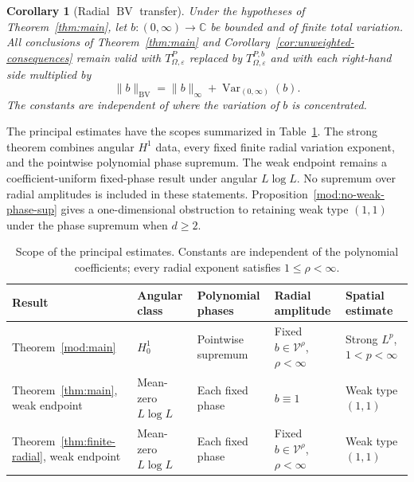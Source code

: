 \documentclass[11pt]{article}
\numberwithin{equation}{section}
\newtheorem{corollary}[theorem]{Corollary}
\theoremstyle{remark}
\theoremstyle{definition}
\newcommand{\Var}{\operatorname{Var}}
\newcommand{\norm}[1]{\lVert #1\rVert}
\newcommand{\BV}{\operatorname{BV}}
\begin{document}
\begin{corollary}[Radial $\BV$ transfer]\label{cor:bv-extension}
Under the hypotheses of Theorem~\ref{thm:main}, let
$b:(0,\infty)\to\mathbb C$ be bounded and of finite total variation.
All conclusions of Theorem~\ref{thm:main} and
Corollary~\ref{cor:unweighted-consequences} remain valid with
$T^P_{\Omega,\varepsilon}$ replaced by $T^{P,b}_{\Omega,\varepsilon}$
and with each right-hand side multiplied by
\[
 \norm b_{\BV}=\norm b_\infty+\Var_{(0,\infty)}(b).
\]
The constants are independent of where the variation of $b$ is
concentrated.
\end{corollary}

The principal estimates have the scopes summarized in
Table~\ref{tab:scope}. The strong theorem combines angular $H^1$ data,
every fixed finite radial variation exponent, and the pointwise polynomial
phase supremum. The weak endpoint remains a coefficient-uniform
fixed-phase result under angular $L\log L$. No supremum over radial
amplitudes is included in these statements.
Proposition~\ref{mod:no-weak-phase-sup} gives a one-dimensional obstruction
to retaining weak type $(1,1)$ under the phase supremum when $d\ge2$.

\begin{table}[htbp]
\centering\small
\renewcommand{\arraystretch}{1.24}
\begin{tabularx}{\textwidth}{@{}>{\raggedright\arraybackslash}p{}
 >{\raggedright\arraybackslash}p{}
 >{\raggedright\arraybackslash}p{}
 >{\raggedright\arraybackslash}p{}
 >{\raggedright\arraybackslash}X@{}}
\toprule
Result & Angular class & Polynomial phases & Radial amplitude & Spatial estimate\\
\midrule
Theorem~\ref{mod:main}
 & $H^1_0$ & Pointwise supremum
 & Fixed $b\in\mathcal V^\rho$, $\rho<\infty$
 & Strong $L^p$, $1<p<\infty$\\
Theorem~\ref{thm:main}, weak endpoint
 & Mean-zero $L\log L$ & Each fixed phase & $b\equiv1$
 & Weak type $(1,1)$\\
Theorem~\ref{thm:finite-radial}, weak endpoint
 & Mean-zero $L\log L$ & Each fixed phase
 & Fixed $b\in\mathcal V^\rho$, $\rho<\infty$
 & Weak type $(1,1)$\\
\bottomrule
\end{tabularx}
\caption{Scope of the principal estimates. Constants are independent of
the polynomial coefficients; every radial exponent satisfies $1\le\rho<\infty$.}
\label{tab:scope}
\end{table}
\end{document}
